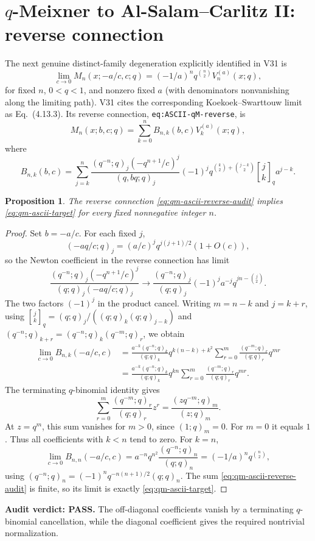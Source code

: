 \documentclass[11pt]{article}
\newtheorem{proposition}{Proposition}
\begin{document}
\section{$q$-Meixner to Al-Salam--Carlitz II: reverse connection}
The next genuine distinct-family degeneration explicitly identified in V31 is
\begin{equation}\label{eq:qm-ascii-target}
\lim_{c\to0}M_n(x;-a/c,c;q)
=(-1/a)^nq^{\binom n2}V_n^{(a)}(x;q),
\end{equation}
for fixed $n$, $0<q<1$, and nonzero fixed $a$ (with denominators
nonvanishing along the limiting path). V31 cites the corresponding
Koekoek--Swarttouw limit as Eq.~(4.13.3). Its reverse connection,
\texttt{eq:ASCII-qM-reverse}, is
\begin{equation}\label{eq:qm-ascii-reverse-audit}
M_n(x;b,c;q)=\sum_{k=0}^n B_{n,k}(b,c)V_k^{(a)}(x;q),
\end{equation}
where
\[
B_{n,k}(b,c)=\sum_{j=k}^n
\frac{(q^{-n};q)_j(-q^{n+1}/c)^j}{(q,bq;q)_j}
(-1)^j q^{\binom k2+\binom{j-k}2}
{j\brack k}_q a^{j-k}.
\]
\begin{proposition}
The reverse connection \eqref{eq:qm-ascii-reverse-audit} implies
\eqref{eq:qm-ascii-target} for every fixed nonnegative integer $n$.
\end{proposition}
\begin{proof}
Set $b=-a/c$. For each fixed $j$,
\[
(-aq/c;q)_j=(a/c)^jq^{j(j+1)/2}(1+O(c)),
\]
so the Newton coefficient in the reverse connection has limit
\[
\frac{(q^{-n};q)_j(-q^{n+1}/c)^j}
{(q;q)_j(-aq/c;q)_j}
\longrightarrow
\frac{(q^{-n};q)_j}{(q;q)_j}
(-1)^ja^{-j}q^{jn-\binom j2}.
\]
The two factors $(-1)^j$ in the product cancel. Writing $m=n-k$
and $j=k+r$, using
\(
{j\brack k}_q=(q;q)_j/((q;q)_k(q;q)_{j-k})
\)
and
\((q^{-n};q)_{k+r}=(q^{-n};q)_k(q^{-m};q)_r\),
we obtain
\begin{align*}
\lim_{c\to0}B_{n,k}(-a/c,c)
&=\frac{a^{-k}(q^{-n};q)_k}{(q;q)_k}
q^{k(n-k)+k^2}
\sum_{r=0}^{m}\frac{(q^{-m};q)_r}{(q;q)_r}q^{mr}\\
&=\frac{a^{-k}(q^{-n};q)_k}{(q;q)_k}q^{kn}
\sum_{r=0}^{m}\frac{(q^{-m};q)_r}{(q;q)_r}q^{mr}.
\end{align*}
The terminating $q$-binomial identity gives
\[
\sum_{r=0}^{m}\frac{(q^{-m};q)_r}{(q;q)_r}z^r
=\frac{(zq^{-m};q)_m}{(z;q)_m}.
\]
At $z=q^m$, this sum vanishes for $m>0$, since
$(1;q)_m=0$. For $m=0$ it equals $1$. Thus all coefficients
with $k<n$ tend to zero. For $k=n$,
\[
\lim_{c\to0}B_{n,n}(-a/c,c)
=a^{-n}q^{n^2}\frac{(q^{-n};q)_n}{(q;q)_n}
=(-1/a)^nq^{\binom n2},
\]
using $(q^{-n};q)_n=(-1)^nq^{-n(n+1)/2}(q;q)_n$.
The sum \eqref{eq:qm-ascii-reverse-audit} is finite, so its limit is
exactly \eqref{eq:qm-ascii-target}.
\end{proof}
\noindent\textbf{Audit verdict: PASS.} The off-diagonal coefficients
vanish by a terminating $q$-binomial cancellation, while the diagonal
coefficient gives the required nontrivial normalization.
\end{document}

